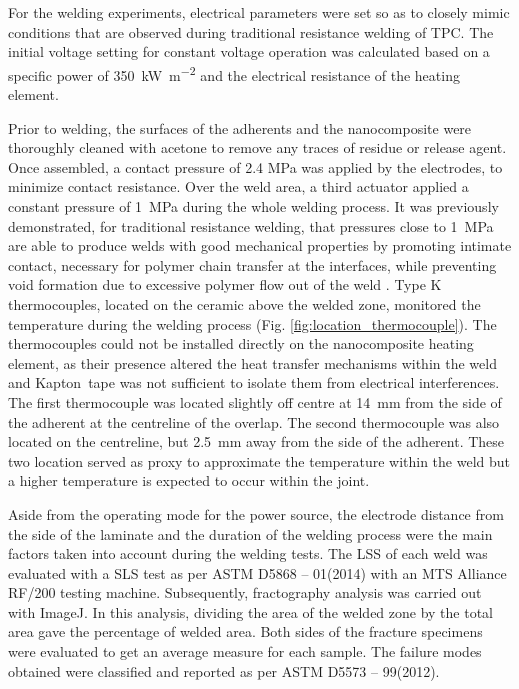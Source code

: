 \documentclass[11pt,review,times]{elsarticle}
\begin{document}
For the welding experiments, electrical parameters were set so as to closely mimic conditions that are observed during traditional resistance welding of TPC. 
The initial voltage setting for constant voltage operation was calculated based on a specific power of \SI{350}{\kW\per\square\metre} and the electrical resistance of the heating element. 

Prior to welding, the surfaces of the adherents and the nanocomposite were thoroughly cleaned with acetone to remove any traces of residue or release agent. 
Once assembled, a contact pressure of 2.4 MPa was applied by the electrodes, to minimize contact resistance. 
Over the weld area, a third actuator applied a constant pressure of \SI{1}{\MPa} during the whole welding process. 
It was previously demonstrated, for traditional resistance welding, that pressures close to \SI{1}{\MPa} are able to produce welds with good mechanical properties by promoting intimate contact, necessary for polymer chain transfer at the interfaces, while preventing void formation due to excessive polymer flow out of the weld \cite{Ageorges2000a, Dube2007, Shi2014}. 
Type K thermocouples, located on the ceramic above the welded zone, monitored the temperature during the welding process (Fig. \ref{fig:location_thermocouple}). 
The thermocouples could not be installed directly on the nanocomposite heating element, as their presence altered the heat transfer mechanisms within the weld and Kapton\textregistered \ tape was not sufficient to isolate them from electrical interferences. 
The first thermocouple was located slightly off centre at \SI{14}{\milli\metre} from the side of the adherent at the centreline of the overlap. 
The second thermocouple was also located on the centreline, but \SI{2.5}{\milli\metre} away from the side of the adherent. 
These two location served as proxy to approximate the temperature within the weld but a higher temperature is expected to occur within the joint. 

Aside from the operating mode for the power source, the electrode distance from the side of the laminate and the duration of the welding process were the main factors taken into account during the welding tests. 
The LSS of each weld was evaluated with a SLS test as per ASTM D5868 – 01(2014) with an MTS Alliance RF/200 testing machine. 
Subsequently, fractography analysis was carried out with ImageJ. 
In this analysis, dividing the area of the welded zone by the total area gave the percentage of welded area. 
Both sides of the fracture specimens were evaluated to get an average measure for each sample. 
The failure modes obtained were classified and reported as per ASTM D5573 – 99(2012). 
\end{document}
